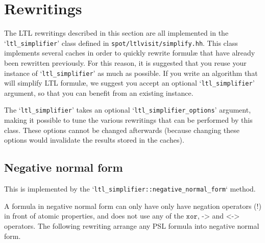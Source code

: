 \documentclass[a4paper,twoside,10pt,DIV=12,draft]{scrreprt}
\DeclareMathOperator{\NOT}{\texttt{!}}
\newcommand{\XOR}{\mathbin{\texttt{xor}}}
\newcommand{\IMPLIES}{\mathbin{\texttt{->}}}
\newcommand{\EQUIV}{\mathbin{\texttt{<->}}}
\newcommand{\0}{\texttt{0}}
\newcommand{\1}{\texttt{1}}
\begin{document}
\chapter{Rewritings}

The LTL rewritings described in this section are all implemented in
the `\verb|ltl_simplifier|' class defined in
\texttt{spot/ltlvisit/simplify.hh}.  This class implements several
caches in order to quickly rewrite formul\ae{} that have already been
rewritten previously.  For this reason, it is suggested that you reuse
your instance of `\verb|ltl_simplifier|' as much as possible.  If you
write an algorithm that will simplify LTL formul\ae{}, we suggest you
accept an optional `\verb|ltl_simplifier|' argument, so that you can
benefit from an existing instance.

The `\verb|ltl_simplifier|' takes an optional
`\verb|ltl_simplifier_options|' argument, making it possible to tune
the various rewritings that can be performed by this class.  These
options cannot be changed afterwards (because changing these options
would invalidate the results stored in the caches).

\section{Negative normal form}\label{sec:nnf}

This is implemented by the `\verb|ltl_simplifier::negative_normal_form|`
method.

A formula in negative normal form can only have only have negation
operators ($\NOT$) in front of atomic properties, and does not use any
of the $\XOR$, $\IMPLIES$ and $\EQUIV$ operators.  The following
rewriting arrange any PSL formula into negative normal form.
\end{document}
